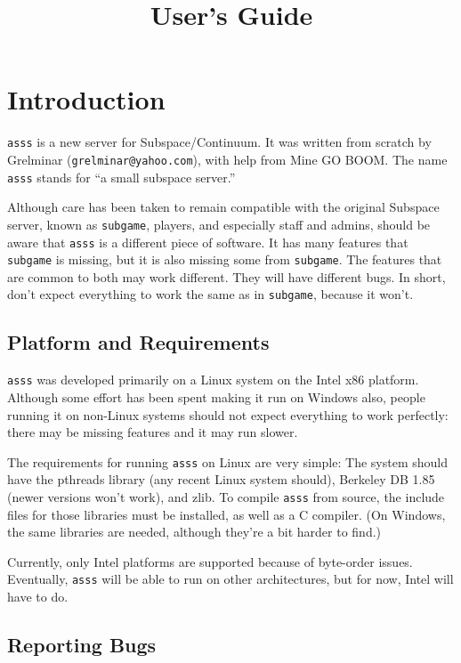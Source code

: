 \documentclass{article}
\title{\asss{} User's Guide}
\newcommand{\asss}{\texttt{asss}}
\newcommand{\subgame}{\texttt{subgame}}
\begin{document}
\maketitle

\section{Introduction}

\asss{} is a new server for Subspace/Continuum. It was written from
scratch by Grelminar (\verb/grelminar@yahoo.com/), with help from Mine
GO BOOM. %
The name \asss{} stands for ``a small subspace server.''

Although care has been taken to remain compatible with the original
Subspace server, known as \subgame{}, players, and especially staff and
admins, should be aware that \asss{} is a different piece of software. It
has many features that \subgame{} is missing, but it is also missing some
from \subgame{}. The features that are common to both may work different.
They will have different bugs. In short, don't expect everything to work
the same as in \subgame{}, because it won't.

\subsection{Platform and Requirements}

\asss{} was developed primarily on a Linux system on the Intel x86
platform. Although some effort has been spent making it run on Windows
also, people running it on non-Linux systems should not expect
everything to work perfectly: there may be missing features and it may
run slower.

The requirements for running \asss{} on Linux are very simple: The
system should have the pthreads library (any recent Linux system
should), Berkeley DB 1.85 (newer versions won't work), and zlib. To
compile \asss{} from source, the include files for those libraries must
be installed, as well as a C compiler. (On Windows, the same libraries
are needed, although they're a bit harder to find.)

Currently, only Intel platforms are supported because of byte-order
issues. Eventually, \asss{} will be able to run on other architectures,
but for now, Intel will have to do.


\subsection{Reporting Bugs}
\end{document}
